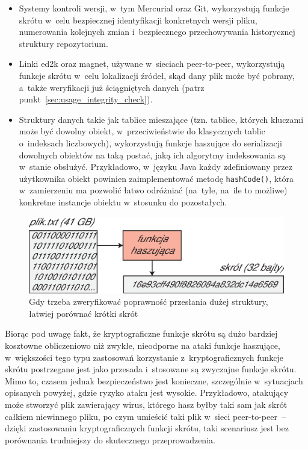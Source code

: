 \documentclass[12pt,a4paper,twoside]{article}
\begin{document}
\begin{itemize}

    \item Systemy kontroli wersji, w~tym Mercurial oraz Git, wykorzystują
    funkcje skrótu w~celu bezpiecznej identyfikacji konkretnych wersji pliku,
    numerowania kolejnych zmian i~bezpiecznego przechowywania historycznej
    struktury repozytorium.

    \item Linki ed2k oraz magnet, używane w~sieciach peer-to-peer, wykorzystują
    funkcje skrótu w~celu lokalizacji źródeł, skąd dany plik może być pobrany,
    a~także weryfikacji już ściągniętych danych (patrz
    punkt~\ref{sec:usage_integrity_check}).

    \item Struktury danych takie jak tablice mieszające (tzn. tablice, których
    kluczami może być dowolny obiekt, w~przeciwieństwie do klasycznych tablic
    o~indeksach liczbowych), wykorzystują funkcje haszujące do serializacji
    dowolnych obiektów na taką postać, jaką ich algorytmy indeksowania są
    w~stanie obsłużyć. Przykładowo, w~języku Java każdy zdefiniowany przez
    użytkownika obiekt powinien zaimplementować metodę \texttt{hashCode()},
    która w~zamierzeniu ma pozwolić łatwo odróżniać (na~tyle, na~ile to
    możliwe) konkretne instancje obiektu w~stosunku do pozostałych.

\end{itemize}

\begin{figure}[bht]
    \includegraphics[width=12cm]{img/usage3.eps}
    \caption{Gdy trzeba zweryfikować poprawność przesłania dużej struktury,
    łatwiej porównać krótki skrót}
\end{figure}

Biorąc pod uwagę fakt, że kryptograficzne funkcje skrótu są dużo bardziej
kosztowne obliczeniowo niż zwykłe, nieodporne na ataki funkcje haszujące,
w~większości tego typu zastosowań korzystanie z~kryptograficznych funkcje
skrótu postrzegane jest jako przesada i~stosowane są zwyczajne funkcje skrótu.
Mimo to, czasem jednak bezpieczeństwo jest konieczne, szczególnie w~sytuacjach
opisanych powyżej, gdzie ryzyko ataku jest wysokie. Przykładowo, atakujący może
stworzyć plik zawierający wirus, którego hasz byłby taki sam jak skrót całkiem
niewinnego pliku, po czym umieścić taki plik w~sieci peer-to-peer~-- dzięki
zastosowaniu kryptograficznych funkcji skrótu, taki scenariusz jest bez
porównania trudniejszy do skutecznego przeprowadzenia.
\end{document}
